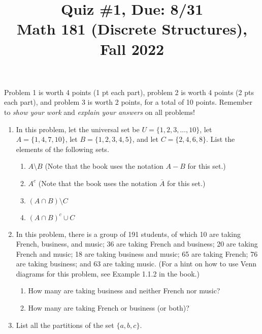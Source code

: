\documentclass[11pt]{article}
\title{Quiz \#1, Due: 8/31 \\Math 181 (Discrete Structures), Fall 2022}
\date{}
\begin{document}
\maketitle

\thispagestyle{empty}

\vspace{-1cm}

Problem 1 is worth 4 points (1 pt each part), problem 2 is worth 4 points (2 pts each part), and problem 3 is worth 2 points, for a total of 10 points. Remember to \emph{show your work} and \emph{explain your answers} on all problems!

\begin{enumerate}
\item In this problem, let the universal set be $U=\{1,2,3,\ldots,10\}$, let $A=\{1,4,7,10\}$, let $B=\{1,2,3,4,5\}$, and let $C=\{2,4,6,8\}$. List the elements of the following sets.

\begin{enumerate}
\item $A \setminus B$ \hfill (Note that the book uses the notation $A-B$ for this set.)
\item $A^c$ \hfill (Note that the book uses the notation $\overline{A}$ for this set.)
\item $(A\cap B) \setminus C$
\item $(A \cap B)^c \cup C$
\end{enumerate}

\item In this problem, there is a group of 191 students, of which 10 are taking French, business, and music; 36 are taking French and business; 20 are taking French and music; 18 are taking business and music; 65 are taking French; 76 are taking business; and 63 are taking music. (For a hint on how to use Venn diagrams for this problem, see Example 1.1.2 in the book.)

\begin{enumerate}
\item How many are taking business and neither French nor music?
\item How many are taking French or business (or both)?
\end{enumerate}

\item List all the partitions of the set $\{a,b,c\}$.

\end{enumerate}
\end{document}
